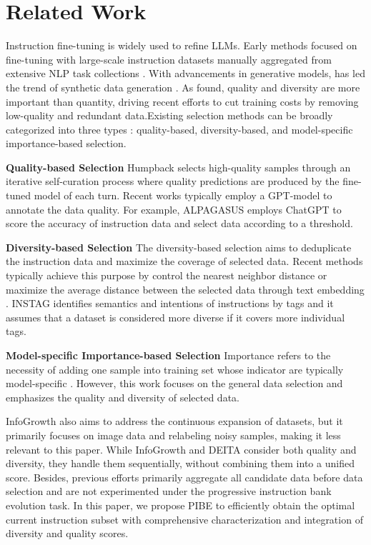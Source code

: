 \section{Related Work}

Instruction fine-tuning is widely used to refine LLMs. Early methods focused on fine-tuning with large-scale instruction datasets \citep{collection-flan-2021, collection-super-natural-inst} manually aggregated from extensive NLP task collections \citep{collection-flan-2022}. With advancements in generative models, \citet{collection-self-instruct} has led the trend of synthetic data generation \citep{collection-alpaca, collection-ultrachat, collection-wizardlm}. 
As \citet{ift-lima} found, quality and diversity are more important than quantity, driving recent efforts to cut training costs by removing low-quality and redundant data.Existing selection methods can be broadly categorized into three types \citep{ds-survey}: quality-based, diversity-based, and model-specific importance-based selection.

\textbf{Quality-based Selection} 
Humpback \citep{ds-self-alignment} selects high-quality samples through an iterative self-curation process where quality predictions are produced by the fine-tuned model of each turn. 
Recent works typically employ a GPT-model to annotate the data quality.  For example, ALPAGASUS \citet{ds-alpagasus} employs ChatGPT to score the accuracy of instruction data and select data according to a threshold. 

\textbf{Diversity-based Selection} 
The diversity-based selection aims to deduplicate the instruction data and maximize the coverage of selected data. Recent methods typically achieve this purpose by control the nearest neighbor distance \citep{ds-deita} or maximize the average distance between the selected data through text embedding \citep{ds-self-evolve}. INSTAG \citep{ds-instag} identifies semantics and intentions of instructions by tags and it assumes that a dataset is considered more diverse if it covers more individual tags.

\textbf{Model-specific Importance-based Selection} Importance refers to the necessity of adding one sample into training set \citep{ds-deita} whose indicator are typically model-specific \citep{ds-less, ds-ifd}. However, this work focuses on the general data selection and emphasizes the quality and diversity of selected data.


InfoGrowth \citep{data-growth} also aims to address the continuous expansion of datasets, but it primarily focuses on image data and relabeling noisy samples, making it less relevant to this paper. While InfoGrowth and DEITA consider both quality and diversity, they handle them sequentially, without combining them into a unified score. Besides, previous efforts primarily aggregate all candidate data before data selection and are not experimented under the progressive instruction bank evolution task. In this paper, we propose PIBE to efficiently obtain the optimal current instruction subset with comprehensive characterization and integration of diversity and quality scores.

